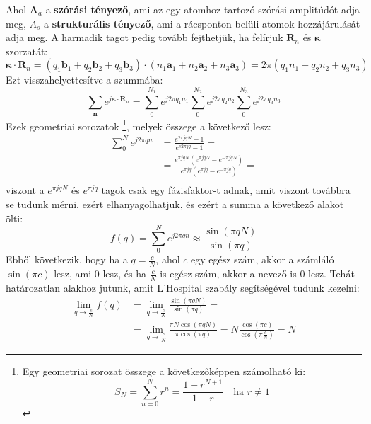 \documentclass[../main.tex]{subfiles}
\begin{document}
Ahol $\mathbf{A}_a$ a \textbf{szórási tényező}, ami az egy atomhoz tartozó szórási amplitúdót adja meg, $A_s$ a \textbf{strukturális tényező}, ami a rácsponton belüli atomok hozzájárulását adja meg.
A harmadik tagot pedig tovább fejthetjük, ha felírjuk $\mathbf{R}_n$ és $\boldsymbol{\kappa}$ szorzatát:
\begin{equation}
    \boldsymbol{\kappa} \cdot \mathbf{R}_n = (q_1 \mathbf{b}_1 + q_2 \mathbf{b}_2 + q_3 \mathbf{b}_3) \cdot (n_1 \mathbf{a}_1 + n_2 \mathbf{a}_2 + n_3 \mathbf{a}_3) = 2 \pi (q_1 n_1 + q_2 n_2 + q_3 n_3)
\end{equation}
Ezt visszahelyettesítve a szummába:
\begin{equation}
    \sum_{\mathbf{n}} e^{j \boldsymbol{\kappa} \cdot \mathbf{R}_n} = \sum_{0}^{N_1} e^{j 2 \pi q_1 n_1} \sum_{0}^{N_2} e^{j 2 \pi q_2 n_2} \sum_{0}^{N_3} e^{j 2 \pi q_3 n_3}
\end{equation}
Ezek geometriai sorozatok
\footnote{
    Egy geometriai sorozat összege a következőképpen számolható ki:
    \begin{equation}
        S_N = \sum_{n=0}^{N} r^n = \frac{1 - r^{N+1}}{1 - r} \quad \text{ha } r \neq 1
    \end{equation}
}, melyek összege a következő lesz:
\begin{equation}
    \begin{aligned}
        \sum_{0}^{N} e^{j 2 \pi q n} &= \frac{e^{2\pi j q N} - 1}{e^{e 2 \pi j q} - 1} = \\
        &= \frac{e^{\pi j q N} \left(e^{\pi j q N} - e^{-\pi j q N}\right)}{e^{\pi j q} \left(e^{\pi j q} - e^{-\pi j q}\right)} = \\
    \end{aligned}
\end{equation}
viszont a $e^{\pi j q N}$ és $e^{\pi j q}$ tagok csak egy fázisfaktor-t adnak, amit viszont továbbra se tudunk mérni, ezért elhanyagolhatjuk, és ezért a summa a következő alakot ölti:
\begin{equation}
   f(q) = \sum_{0}^{N} e^{j 2 \pi q n} \approx \frac{\sin(\pi q N)}{\sin(\pi q)} 
\end{equation}
Ebből következik, hogy ha a $q = \frac{c}{N}$,  ahol $c$ egy egész szám, akkor a számláló $\sin(\pi c)$ lesz, ami 0 lesz, és ha $\frac{c}{N}$ is egész szám, akkor a nevező is 0 lesz. Tehát határozatlan alakhoz jutunk, amit L'Hospital szabály segítségével tudunk kezelni:
\begin{equation}
   \begin{aligned}
        \lim_{q \to \frac{c}{N}} f(q) &= \lim_{q \to \frac{c}{N}} \frac{\sin(\pi q N)}{\sin(\pi q)} = \\
        &= \lim_{q \to \frac{c}{N}} \frac{\pi N \cos(\pi q N)}{\pi \cos(\pi q)} = N \frac{\cos(\pi c)}{\cos\left(\pi \frac{c}{N}\right)} = N
   \end{aligned}
\end{equation}
\end{document}
